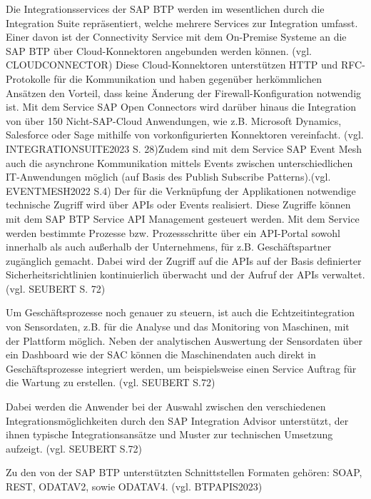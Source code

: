 Die Integrationsservices der SAP BTP werden im wesentlichen durch die Integration Suite repräsentiert, welche mehrere Services zur Integration umfasst. Einer davon ist der Connectivity Service mit dem On-Premise Systeme an die SAP BTP über Cloud-Konnektoren angebunden werden können. (vgl. CLOUDCONNECTOR) Diese Cloud-Konnektoren unterstützen HTTP und RFC-Protokolle für die Kommunikation und haben gegenüber herkömmlichen Ansätzen den Vorteil, dass keine Änderung der Firewall-Konfiguration notwendig ist. Mit dem Service SAP Open Connectors wird darüber hinaus die Integration von über 150 Nicht-SAP-Cloud Anwendungen, wie z.B. Microsoft Dynamics, Salesforce oder Sage mithilfe von vorkonfigurierten Konnektoren vereinfacht. (vgl. INTEGRATIONSUITE2023 S. 28)Zudem sind mit dem Service SAP Event Mesh auch die asynchrone Kommunikation mittels Events zwischen unterschiedlichen IT-Anwendungen möglich (auf Basis des Publish Subscribe Patterns).(vgl. EVENTMESH2022 S.4) Der für die Verknüpfung der Applikationen notwendige technische Zugriff wird über APIs oder Events realisiert. Diese Zugriffe können mit dem SAP BTP Service API Management gesteuert werden. Mit dem Service werden bestimmte Prozesse bzw. Prozessschritte über ein API-Portal sowohl innerhalb als auch außerhalb der Unternehmens, für z.B. Geschäftspartner zugänglich gemacht. Dabei wird der Zugriff auf die APIs auf der Basis definierter Sicherheitsrichtlinien kontinuierlich überwacht und der Aufruf der APIs verwaltet. (vgl. SEUBERT S. 72)

Um Geschäftsprozesse noch genauer zu steuern, ist auch die Echtzeitintegration von Sensordaten, z.B. für die Analyse und das Monitoring von Maschinen, mit der Plattform möglich. Neben der analytischen Auswertung der Sensordaten über ein Dashboard wie der SAC können die Maschinendaten auch direkt in Geschäftsprozesse integriert werden, um beispielsweise einen Service Auftrag für die Wartung zu erstellen. (vgl. SEUBERT S.72)

Dabei werden die Anwender bei der Auswahl zwischen den verschiedenen Integrationsmöglichkeiten durch den SAP Integration Advisor unterstützt, der ihnen typische Integrationsansätze und Muster zur technischen Umsetzung aufzeigt. (vgl. SEUBERT S.72)

Zu den von der SAP BTP unterstützten Schnittstellen Formaten gehören: SOAP, REST, ODATAV2, sowie ODATAV4. (vgl. BTPAPIS2023)


